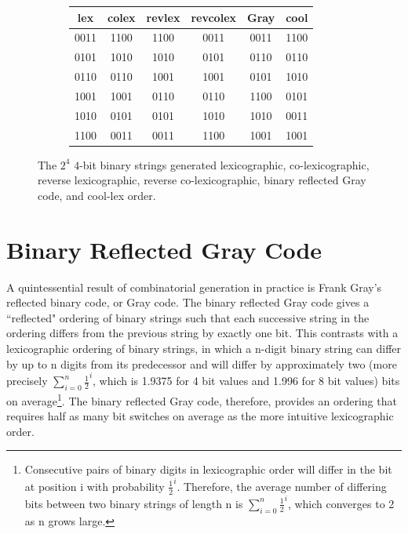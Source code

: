 \begin{figure}[]
\begin{subfigure}[]{\textwidth}
         \begin{center}
             \begin{tabular}{ |c|c|c|c||c||c| } 
                 \hline
                 lex  & colex & revlex & revcolex & Gray & cool\\
                 \hline
                 0011 & 1100 & 1100 & 0011 & 0011 & 1100 \\
                 0101 & 1010 & 1010 & 0101 & 0110 & 0110 \\
                 0110 & 0110 & 1001 & 1001 & 0101 & 1010 \\
                 1001 & 1001 & 0110 & 0110 & 1100 & 0101 \\
                 1010 & 0101 & 0101 & 1010 & 1010 & 0011 \\
                 1100 & 0011 & 0011 & 1100 & 1001 & 1001 \\
                 \hline
             \end{tabular}
         \end{center}
         \label{fig:2c2}
     \end{subfigure}
     \begin{center}

     \end{center}
     \caption{The $2^4$ $4$-bit binary strings generated lexicographic, co-lexicographic, reverse lexicographic, reverse co-lexicographic, binary reflected Gray code, and cool-lex order.}
     \label{fig:bintable}
 \end{figure}


\section{Binary Reflected Gray Code} \label{sec:BRGC}

A quintessential result of combinatorial generation in practice is Frank Gray's reflected binary code, or Gray code. The binary reflected Gray code gives a ``reflected" ordering of binary strings such that each successive string in the ordering differs from the previous string by exactly one bit. This contrasts with a lexicographic ordering of binary strings, in which a n-digit binary string can differ by up to n digits from its predecessor and will differ by approximately two (more precisely $\sum_{i=0}^n\frac{1}{2}^i$, which is 1.9375 for 4 bit values and 1.996 for 8 bit values) bits on average\footnote{Consecutive pairs of binary digits in lexicographic order will differ in the bit at position i with probability $\frac{1}{2}^i$.  Therefore, the average number of differing bits between two binary strings of length n is $\sum_{i=0}^n\frac{1}{2}^i$, which converges to 2 as n grows large.}. The binary reflected Gray code, therefore, provides an ordering that requires half as many bit switches on average as the more intuitive lexicographic order. 

